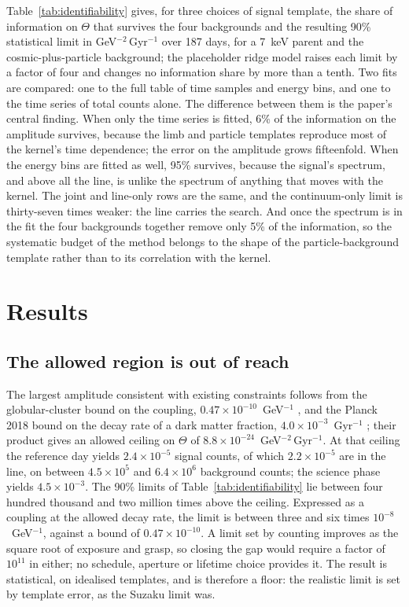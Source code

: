 \documentclass[11pt]{article}
\newcommand{\Th}{\Theta}
\begin{document}
Table~\ref{tab:identifiability} gives, for three choices of signal template, the share of information on $\Th$ that survives the four backgrounds and the resulting 90\% statistical limit in GeV$^{-2}$\,Gyr$^{-1}$ over 187 days, for a 7~keV parent and the cosmic-plus-particle background; the placeholder ridge model raises each limit by a factor of four and changes no information share by more than a tenth. Two fits are compared: one to the full table of time samples and energy bins, and one to the time series of total counts alone. The difference between them is the paper's central finding. When only the time series is fitted, 6\% of the information on the amplitude survives, because the limb and particle templates reproduce most of the kernel's time dependence; the error on the amplitude grows fifteenfold. When the energy bins are fitted as well, 95\% survives, because the signal's spectrum, and above all the line, is unlike the spectrum of anything that moves with the kernel. The joint and line-only rows are the same, and the continuum-only limit is thirty-seven times weaker: the line carries the search. And once the spectrum is in the fit the four backgrounds together remove only 5\% of the information, so the systematic budget of the method belongs to the shape of the particle-background template rather than to its correlation with the kernel.

\section{Results}
\label{sec:results}

\subsection{The allowed region is out of reach}

The largest amplitude consistent with existing constraints follows from the globular-cluster bound on the coupling, $0.47\times10^{-10}$~GeV$^{-1}$ \citep{dolan2022globular}, and the Planck 2018 bound on the decay rate of a dark matter fraction, $4.0\times10^{-3}$~Gyr$^{-1}$ \citep{nygaard2021decaying,poulin2016decaying}; their product gives an allowed ceiling on $\Th$ of $8.8\times10^{-24}$~GeV$^{-2}$\,Gyr$^{-1}$. At that ceiling the reference day yields $2.4\times10^{-5}$ signal counts, of which $2.2\times10^{-5}$ are in the line, on between $4.5\times10^{5}$ and $6.4\times10^{6}$ background counts; the science phase yields $4.5\times10^{-3}$. The 90\% limits of Table~\ref{tab:identifiability} lie between four hundred thousand and two million times above the ceiling. Expressed as a coupling at the allowed decay rate, the limit is between three and six times $10^{-8}$~GeV$^{-1}$, against a bound of $0.47\times10^{-10}$. A limit set by counting improves as the square root of exposure and grasp, so closing the gap would require a factor of $10^{11}$ in either; no schedule, aperture or lifetime choice provides it. The result is statistical, on idealised templates, and is therefore a floor: the realistic limit is set by template error, as the Suzaku limit was.
\end{document}
